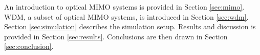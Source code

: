 
An introduction to optical MIMO systems is provided in Section \ref{sec:mimo}. WDM, a subset of optical MIMO systems, is introduced in Section \ref{sec:wdm}. Section \ref{sec:simulation} describes the simulation setup. Results and discussion is provided in Section \ref{sec:results}. Conclusions are then drawn in Section \ref{sec:conclusion}. 